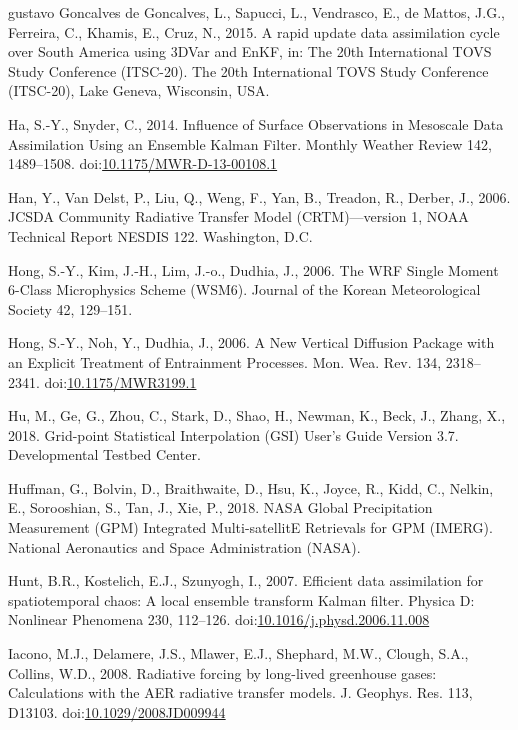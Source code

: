 \documentclass[final,5p,times,twocolumn,authoryear]{elsarticle} %
\begin{document}
\leavevmode\hypertarget{ref-goncalvesdegoncalves2015}{}%
gustavo Goncalves de Goncalves, L., Sapucci, L., Vendrasco, E., de Mattos, J.G., Ferreira, C., Khamis, E., Cruz, N., 2015. A rapid update data assimilation cycle over South America using 3DVar and EnKF, in: The 20th International TOVS Study Conference (ITSC-20). The 20th International TOVS Study Conference (ITSC-20), Lake Geneva, Wisconsin, USA.

\leavevmode\hypertarget{ref-ha2014}{}%
Ha, S.-Y., Snyder, C., 2014. Influence of Surface Observations in Mesoscale Data Assimilation Using an Ensemble Kalman Filter. Monthly Weather Review 142, 1489--1508. doi:\href{https://doi.org/10.1175/MWR-D-13-00108.1}{10.1175/MWR-D-13-00108.1}

\leavevmode\hypertarget{ref-han2006}{}%
Han, Y., Van Delst, P., Liu, Q., Weng, F., Yan, B., Treadon, R., Derber, J., 2006. JCSDA Community Radiative Transfer Model (CRTM)---version 1, NOAA Technical Report NESDIS 122. Washington, D.C.

\leavevmode\hypertarget{ref-hong2006a}{}%
Hong, S.-Y., Kim, J.-H., Lim, J.-o., Dudhia, J., 2006. The WRF Single Moment 6-Class Microphysics Scheme (WSM6). Journal of the Korean Meteorological Society 42, 129--151.

\leavevmode\hypertarget{ref-hong2006}{}%
Hong, S.-Y., Noh, Y., Dudhia, J., 2006. A New Vertical Diffusion Package with an Explicit Treatment of Entrainment Processes. Mon. Wea. Rev. 134, 2318--2341. doi:\href{https://doi.org/10.1175/MWR3199.1}{10.1175/MWR3199.1}

\leavevmode\hypertarget{ref-hu2018}{}%
Hu, M., Ge, G., Zhou, C., Stark, D., Shao, H., Newman, K., Beck, J., Zhang, X., 2018. Grid-point Statistical Interpolation (GSI) User's Guide Version 3.7. Developmental Testbed Center.

\leavevmode\hypertarget{ref-huffman2018}{}%
Huffman, G., Bolvin, D., Braithwaite, D., Hsu, K., Joyce, R., Kidd, C., Nelkin, E., Sorooshian, S., Tan, J., Xie, P., 2018. NASA Global Precipitation Measurement (GPM) Integrated Multi-satellitE Retrievals for GPM (IMERG). National Aeronautics and Space Administration (NASA).

\leavevmode\hypertarget{ref-hunt2007}{}%
Hunt, B.R., Kostelich, E.J., Szunyogh, I., 2007. Efficient data assimilation for spatiotemporal chaos: A local ensemble transform Kalman filter. Physica D: Nonlinear Phenomena 230, 112--126. doi:\href{https://doi.org/10.1016/j.physd.2006.11.008}{10.1016/j.physd.2006.11.008}

\leavevmode\hypertarget{ref-iacono2008}{}%
Iacono, M.J., Delamere, J.S., Mlawer, E.J., Shephard, M.W., Clough, S.A., Collins, W.D., 2008. Radiative forcing by long-lived greenhouse gases: Calculations with the AER radiative transfer models. J. Geophys. Res. 113, D13103. doi:\href{https://doi.org/10.1029/2008JD009944}{10.1029/2008JD009944}
\end{document}

